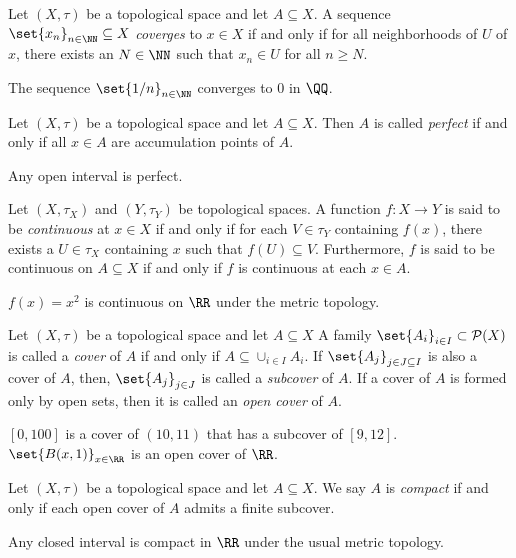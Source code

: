 \begin{definition*}
	Let $(X,\tau)$ be a topological space and let $A\subseteq X$.
	A sequence $\set{x_n}_{n\in\NN}\subseteq X$ \textit{coverges} to $x\in X$ if and only if for all neighborhoods of $U$ of $x$, there exists an $N\in\NN$ such that $x_n\in U$ for all $n\geq N$.
\end{definition*}
\begin{example*}
	The sequence $\set{1/n}_{n\in\NN}$ converges to $0$ in $\QQ$.
\end{example*}

\begin{definition*}
	Let $(X,\tau)$ be a topological space and let $A\subseteq X$.
	Then $A$ is called \textit{perfect} if and only if all $x\in A$ are accumulation points of $A$.
\end{definition*}
\begin{example*}
	Any open interval is perfect.
\end{example*}

\begin{definition*}
	Let $(X,\tau_X)$ and $(Y,\tau_Y)$ be topological spaces.
	A function $f:X\rightarrow Y$ is said to be \textit{continuous} at $x\in X$ if and only if for each $V\in\tau_Y$ containing $f(x)$, there exists a $U\in\tau_X$ containing $x$ such that $f(U)\subseteq V$.
	Furthermore, $f$ is said to be continuous on $A\subseteq X$ if and only if $f$ is continuous at each $x\in A$.
\end{definition*}
\begin{example*}
	$f(x)=x^2$ is continuous on $\RR$ under the metric topology.
\end{example*}

\begin{definition*}
	Let $(X,\tau)$ be a topological space and let $A\subseteq X$
	A family $\set{A_i}_{i\in I}\subset \mathcal{P}(X)$ is called a \textit{cover} of $A$ if and only if $A\subseteq\cup_{i\in I} A_i$.
	If $\set{A_j}_{j\in J\subseteq I}$ is also a cover of $A$, then, $\set{A_j}_{j\in J}$ is called a \textit{subcover} of $A$.
	If a cover of $A$ is formed only by open sets, then it is called an \textit{open cover} of $A$.
\end{definition*}
\begin{example*}
	$[0,100]$ is a cover of $(10,11)$ that has a subcover of $[9,12]$.
	$\set{B(x,1)}_{x\in\RR}$ is an open cover of $\RR$.
\end{example*}

\begin{definition*}
	Let $(X,\tau)$ be a topological space and let $A\subseteq X$.
	We say $A$ is \textit{compact} if and only if each open cover of $A$ admits a finite subcover.
\end{definition*}
\begin{example*}
	Any closed interval is compact in $\RR$ under the usual metric topology.
\end{example*}

